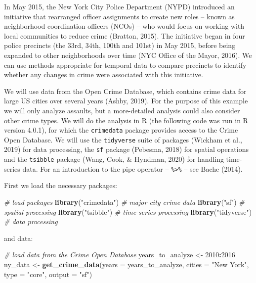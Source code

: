\documentclass[
  english,
  man,a4paper,mask,floatsintext]{apa6}
\newenvironment{Shaded}{\begin{snugshade}}{\end{snugshade}}
\newcommand{\CommentTok}[1]{\textcolor[rgb]{0.56,0.35,0.01}{\textit{#1}}}
\newcommand{\DataTypeTok}[1]{\textcolor[rgb]{0.13,0.29,0.53}{#1}}
\newcommand{\DecValTok}[1]{\textcolor[rgb]{0.00,0.00,0.81}{#1}}
\newcommand{\KeywordTok}[1]{\textcolor[rgb]{0.13,0.29,0.53}{\textbf{#1}}}
\newcommand{\NormalTok}[1]{#1}
\newcommand{\OperatorTok}[1]{\textcolor[rgb]{0.81,0.36,0.00}{\textbf{#1}}}
\newcommand{\StringTok}[1]{\textcolor[rgb]{0.31,0.60,0.02}{#1}}
\begin{document}
In May 2015, the New York City Police Department (NYPD) introduced an initiative that rearranged officer assignments to create new roles -- known as neighborhood coordination officers (NCOs) -- who would focus on working with local communities to reduce crime (Bratton, 2015). The initiative began in four police precincts (the 33rd, 34th, 100th and 101st) in May 2015, before being expanded to other neighborhoods over time (NYC Office of the Mayor, 2016). We can use methods appropriate for temporal data to compare precincts to identify whether any changes in crime were associated with this initiative.

We will use data from the Open Crime Database, which contains crime data for large US cities over several years (Ashby, 2019). For the purpose of this example we will only analyze assaults, but a more-detailed analysis could also consider other crime types. We will do the analysis in R (the following code was run in R version 4.0.1), for which the \texttt{crimedata} package provides access to the Crime Open Database. We will use the \texttt{tidyverse} suite of packages (Wickham et al., 2019) for data processing, the \texttt{sf} package (Pebesma, 2018) for spatial operations and the \texttt{tsibble} package (Wang, Cook, \& Hyndman, 2020) for handling time-series data. For an introduction to the pipe operator -- \texttt{\%\textgreater{}\%} -- see Bache (2014).

First we load the necessary packages:

\footnotesize

\begin{Shaded}
\begin{Highlighting}[]
\CommentTok{# load packages}
\KeywordTok{library}\NormalTok{(}\StringTok{"crimedata"}\NormalTok{) }\CommentTok{# major city crime data}
\KeywordTok{library}\NormalTok{(}\StringTok{"sf"}\NormalTok{)        }\CommentTok{# spatial processing}
\KeywordTok{library}\NormalTok{(}\StringTok{"tsibble"}\NormalTok{)   }\CommentTok{# time-series processing}
\KeywordTok{library}\NormalTok{(}\StringTok{"tidyverse"}\NormalTok{) }\CommentTok{# data processing}
\end{Highlighting}
\end{Shaded}

\normalsize

and data:

\footnotesize

\begin{Shaded}
\begin{Highlighting}[]
\CommentTok{# load data from the Crime Open Database}
\NormalTok{years_to_analyze <-}\StringTok{ }\DecValTok{2010}\OperatorTok{:}\DecValTok{2016}
\NormalTok{ny_data <-}\StringTok{ }\KeywordTok{get_crime_data}\NormalTok{(}\DataTypeTok{years =}\NormalTok{ years_to_analyze, }\DataTypeTok{cities =} \StringTok{"New York"}\NormalTok{, }
                          \DataTypeTok{type =} \StringTok{"core"}\NormalTok{, }\DataTypeTok{output =} \StringTok{"sf"}\NormalTok{)}
\end{Highlighting}
\end{Shaded}
\end{document}
